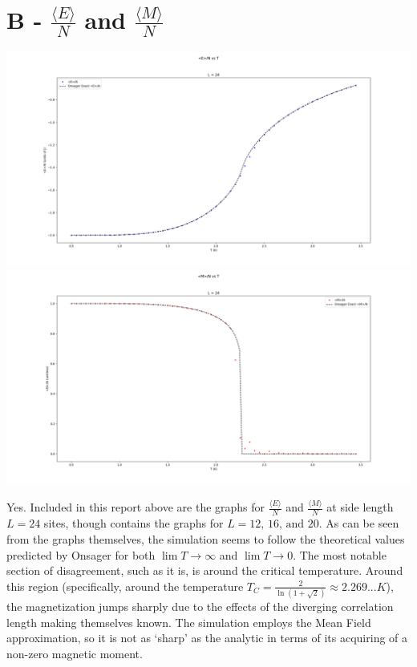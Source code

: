 \documentclass{article}
\begin{document}
    \section{B - $\frac{\langle E \rangle}{N} $ and $ \frac{\langle M \rangle}{N} $}
    	\includegraphics[width=\textwidth]{B/B-24-EoNvT} 
    	\includegraphics[width=\textwidth]{B/B-24-MoNvT}
    	
    	Yes. Included in this report above are the graphs for $\frac{\langle E \rangle}{N} $ and $ \frac{\langle M \rangle}{N} $ at side length $ L = 24 $ sites, though \cite{crock2} contains the graphs for $ L = 12\text{, }16\text{, and }20$. As can be seen from the graphs themselves, the simulation seems to follow the theoretical values predicted by Onsager for both $ \lim T \rightarrow \infty $ and $ \lim T \rightarrow 0 $. The most notable section of disagreement, such as it is, is around the critical temperature. Around this region (specifically, around the temperature $ T_C = \frac{2}{\ln(1+\sqrt{2})} \approx 2.269... K $), the magnetization jumps sharply due to the effects of the diverging correlation length making themselves known. The simulation employs the Mean Field approximation, so it is not as `sharp' as the analytic in terms of its acquiring of a non-zero magnetic moment.
\end{document}
